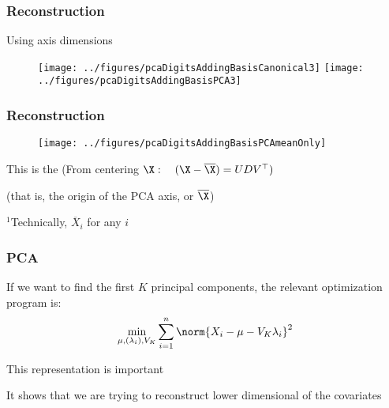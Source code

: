 \documentclass[12pt]{beamer}
\begin{document}
\begin{frame}[fragile]
\frametitle{Reconstruction}
Using  axis dimensions
\begin{figure}
\centering
\texttt{[image: ../figures/pcaDigitsAddingBasisCanonical3]}
\texttt{[image: ../figures/pcaDigitsAddingBasisPCA3]}
\end{figure}
\end{frame}

\begin{frame}[fragile]
\frametitle{Reconstruction}

\begin{figure}
\centering
\texttt{[image: ../figures/pcaDigitsAddingBasisPCAmeanOnly]}
\end{figure}

This is the  (From centering $\X: \quad (\X - \overline{\X}) = UDV^{\top})$

{\scriptsize (that is, the origin of the PCA axis, or $\overline{\X}$)}\footnotemark

\vsp

\vsp

{\footnotesize $^1$Technically, $\overline{X}_i$ for any $i$}
\end{frame}



\begin{frame}[fragile]
\frametitle{PCA}
If we want to find the first $K$ principal components,
the relevant optimization program  is:
\[
\min_{\mu,(\lambda_i),V_K} \sum_{i=1}^n \norm{X_i - \mu - V_K \lambda_i}^2
\]

This representation is important
\vsp

It shows that we are trying to reconstruct lower dimensional 
of the covariates
\end{frame}
\end{document}
